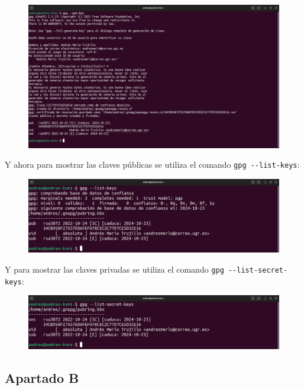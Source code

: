 \documentclass{article}
\begin{document}
\begin{figure}[H]
    \includegraphics[width=\textwidth]{imagenes/Portatil/Captura desde 2022-10-24 11-46-02.png}
\end{figure}

Y ahora para mostrar las claves públicas se utiliza el comando \verb|gpg --list-keys|:

\begin{figure}[H]
    \includegraphics[width=\textwidth]{imagenes/Portatil/Captura desde 2022-10-24 11-46-16.png}
\end{figure}

Y para mostrar las claves privadas se utiliza el comando \verb|gpg --list-secret-keys|:

\begin{figure}[H]
    \includegraphics[width=\textwidth]{imagenes/Portatil/Captura desde 2022-10-24 11-46-25.png}
\end{figure}

\subsection*{Apartado B}
\end{document}
